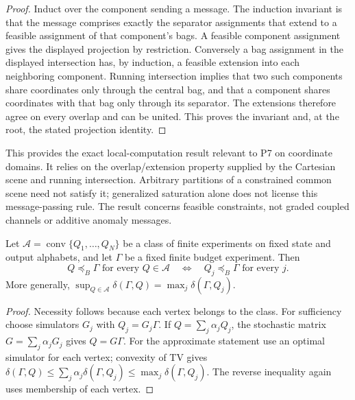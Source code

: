 \begin{proof}

Induct over the component sending a message. The induction invariant is that the message comprises exactly the separator assignments that extend to a feasible assignment of that component's bags. A feasible component assignment gives the displayed projection by restriction. Conversely a bag assignment in the displayed intersection has, by induction, a feasible extension into each neighboring component. Running intersection implies that two such components share coordinates only through the central bag, and that a component shares coordinates with that bag only through its separator. The extensions therefore agree on every overlap and can be united. This proves the invariant and, at the root, the stated projection identity.
\end{proof}

This provides the exact local-computation result relevant to P7 on coordinate domains. It relies on the overlap/extension property supplied by the Cartesian scene and running intersection. Arbitrary partitions of a constrained common scene need not satisfy it; generalized saturation alone does not license this message-passing rule. The result concerns feasible constraints, not graded coupled channels or additive anomaly messages.


\begin{thmplain}

Let \(\mathcal A=\operatorname{conv}\{Q_1,\ldots,Q_N\}\) be a class of finite experiments on fixed state and output alphabets, and let \(\Gamma\) be a fixed finite budget experiment. Then
\[Q\preceq_B\Gamma\text{ for every }Q\in\mathcal A
\quad\Longleftrightarrow\quad
Q_j\preceq_B\Gamma\text{ for every }j.\]
More generally, \(\sup_{Q\in\mathcal A}\delta(\Gamma,Q)=\max_j\delta(\Gamma,Q_j)\).
\end{thmplain}

\begin{proof}

Necessity follows because each vertex belongs to the class. For sufficiency choose simulators \(G_j\) with \(Q_j=G_j\Gamma\). If \(Q=\sum_j\alpha_jQ_j\), the stochastic matrix \(G=\sum_j\alpha_jG_j\) gives \(Q=G\Gamma\). For the approximate statement use an optimal simulator for each vertex; convexity of TV gives \(\delta(\Gamma,Q)\le\sum_j\alpha_j\delta(\Gamma,Q_j)\le\max_j\delta(\Gamma,Q_j)\). The reverse inequality again uses membership of each vertex.
\end{proof}

